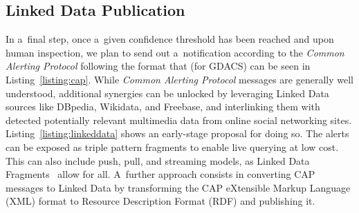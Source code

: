 \documentclass[letterpaper]{article}
\begin{document}
\subsection{Linked Data Publication}

In a~final step, once a~given confidence threshold has been reached
and upon human inspection, we plan to send out a~notification
according to the \emph{Common Alerting Protocol}
following the format that (for GDACS) can be seen in Listing~\ref{listing:cap}.
While \emph{Common Alerting Protocol} messages are generally well understood,
additional synergies can be unlocked by leveraging Linked Data sources
like DBpedia, Wikidata, and Freebase, and interlinking them with detected
potentially relevant multimedia data from online social networking sites.
Listing~\ref{listing:linkeddata} shows an early-stage proposal for doing so. 
The alerts can be exposed as triple pattern fragments
to enable live querying at low cost.
This can also include push, pull, and streaming models,
as Linked Data Fragments~\cite{verborgh2014ldfiswc} allow for all.
A~further approach consists in converting CAP messages to
Linked Data by transforming the CAP eXtensible Markup Language (XML) format
to Resource Description Format (RDF) and publishing it.
\end{document}
